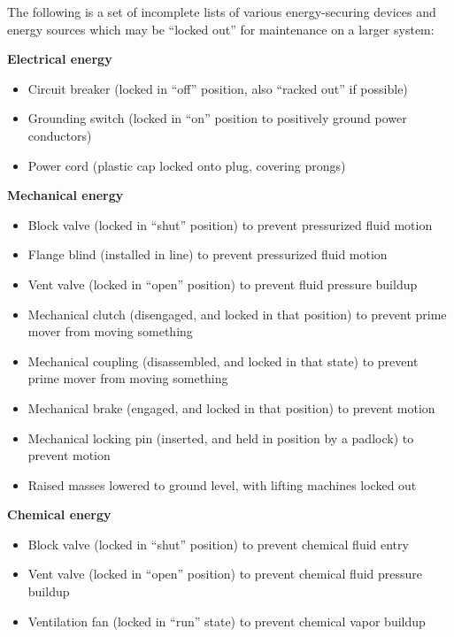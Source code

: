 \filbreak

The following is a set of incomplete lists of various energy-securing devices and energy sources which may be ``locked out'' for maintenance on a larger system:

\vskip 10pt

\noindent
\textbf{Electrical energy}

\begin{itemize}
\item Circuit breaker (locked in ``off'' position, also ``racked out'' if possible)
\item Grounding switch (locked in ``on'' position to positively ground power conductors)
\item Power cord (plastic cap locked onto plug, covering prongs)
\end{itemize}

\vskip 10pt

\noindent
\textbf{Mechanical energy}

\begin{itemize}
\item Block valve (locked in ``shut'' position) to prevent pressurized fluid motion
\item Flange blind (installed in line) to prevent pressurized fluid motion
\item Vent valve (locked in ``open'' position) to prevent fluid pressure buildup
\item Mechanical clutch (disengaged, and locked in that position) to prevent prime mover from moving something
\item Mechanical coupling (disassembled, and locked in that state) to prevent prime mover from moving something
\item Mechanical brake (engaged, and locked in that position) to prevent motion
\item Mechanical locking pin (inserted, and held in position by a padlock) to prevent motion
\item Raised masses lowered to ground level, with lifting machines locked out
\end{itemize}

\vskip 10pt

\noindent
\textbf{Chemical energy}

\begin{itemize}
\item Block valve (locked in ``shut'' position) to prevent chemical fluid entry
\item Vent valve (locked in ``open'' position) to prevent chemical fluid pressure buildup
\item Ventilation fan (locked in ``run'' state) to prevent chemical vapor buildup
\end{itemize}

